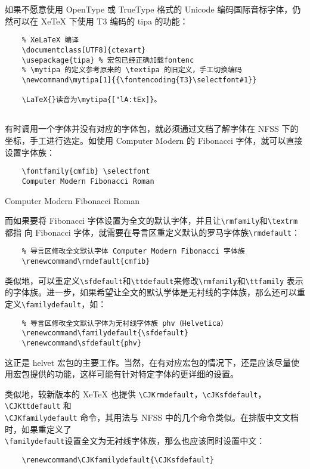 如果不愿意使用 OpenType 或 TrueType 格式的 Unicode 编码国际音标字体，仍然可以在 XeTeX 下使用 T3 编码的 tipa 的功能：

\begin{lstlisting}
    % XeLaTeX 编译
    \documentclass[UTF8]{ctexart}
    \usepackage{tipa} % 宏包已经正确加载fontenc
    % \mytipa 的定义参考原来的 \textipa 的旧定义，手工切换编码
    \newcommand\mytipa[1]{{\fontencoding{T3}\selectfont#1}}
    
    \LaTeX{}读音为\mytipa{["lA:tEx]}。
    
\end{lstlisting}

有时调用一个字体并没有对应的字体包，就必须通过文档了解字体在 NFSS 下的坐标，手工进行选定。如使用 Computer Modern 的 Fibonacci 字体，就可以直接设置字体族：

\begin{minipage}[t]{0.45\textwidth}
\begin{lstlisting}
    \fontfamily{cmfib} \selectfont
    Computer Modern Fibonacci Roman
\end{lstlisting}
\end{minipage}
\hfill
\begin{minipage}[t]{0.45\textwidth}
     \selectfont
    Computer Modern Fibonacci Roman
\end{minipage}

而如果要将 Fibonacci 字体设置为全文的默认字体，并且让\verb|\rmfamily|和\verb|\textrm|都指
向 Fibonacci 字体，就需要在导言区重定义默认的罗马字体族\verb|\rmdefault|：

\begin{lstlisting}
    % 导言区修改全文默认字体 Computer Modern Fibonacci 字体族
    \renewcommand\rmdefault{cmfib}
\end{lstlisting}

类似地，可以重定义\verb|\sfdefault|和\verb|\ttdefault|来修改\verb|\rmfamily|和\verb|\ttfamily| 表示的字体族。进一步，如果希望让全文的默认学体是无衬线的字体族，那么还可以重定义\verb|\familydefault|，如：
\begin{lstlisting}
    % 导言区修改全文默认字体为无衬线字体族 phv（Helvetica）
    \renewcommand\familydefault{\sfdefault}
    \renewcommand\sfdefault{phv}
\end{lstlisting}

这正是 helvet 宏包的主要工作。当然，在有对应宏包的情况下，还是应该尽量使用宏包提供的功能，这样可能有针对特定字体的更详细的设置。

类似地，较新版本的 XeTeX 也提供 \verb|\CJKrmdefault|，\verb|\cJKsfdefault|，\verb|\CJKttdefault| 和\\ \verb|\CJKfamilydefault| 命令，其用法与 NFSS 中的几个命令类似。在排版中文文档时，如果重定义了\\\verb|\familydefault|设置全文为无衬线字体族，那么也应该同时设置中文：
\begin{lstlisting}
    \renewcommand\CJKfamilydefault{\CJKsfdefault}
\end{lstlisting}

